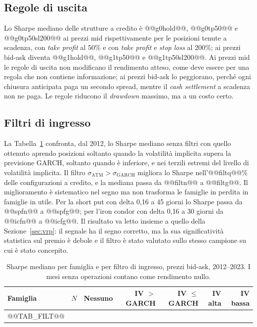 \documentclass[11pt,a4paper]{article}
\begin{document}
\subsection{Regole di uscita}

Lo Sharpe mediano delle strutture a credito è @@g0hold@@, @@g0tp50@@ e @@g0tp50sl200@@ ai prezzi mid rispettivamente per le posizioni tenute a scadenza, con \emph{take profit} al 50\% e con \emph{take profit} e \emph{stop loss} al 200\%; ai prezzi bid-ask diventa @@g1hold@@, @@g1tp50@@ e @@g1tp50sl200@@. Ai prezzi mid le regole di uscita non modificano il rendimento atteso, come deve essere per una regola che non contiene informazione; ai prezzi bid-ask lo peggiorano, perché ogni chiusura anticipata paga un secondo spread, mentre il \emph{cash settlement} a scadenza non ne paga. Le regole riducono il \emph{drawdown} massimo, ma a un costo certo.

\subsection{Filtri di ingresso}

La Tabella~\ref{tab:filt} confronta, dal 2012, lo Sharpe mediano senza filtri con quello ottenuto aprendo posizioni soltanto quando la volatilità implicita supera la previsione GARCH, soltanto quando è inferiore, e nei terzili estremi del livello di volatilità implicita. Il filtro $\sigma_{\mathrm{ATM}}>\sigma_{\mathrm{GARCH}}$ migliora lo Sharpe nell'@@filtq@@\% delle configurazioni a credito, e la mediana passa da @@filtn@@ a @@filtg@@. Il miglioramento è sistematico nel segno ma non trasforma le famiglie in perdita in famiglie in utile. Per la short put con delta 0{,}16 a 45 giorni lo Sharpe passa da @@spfn@@ a @@spfg@@; per l'iron condor con delta 0{,}16 a 30 giorni da @@icfn@@ a @@icfg@@. Il risultato va letto insieme a quello della Sezione~\ref{sec:vrp}: il segnale ha il segno corretto, ma la sua significatività statistica sul premio è debole e il filtro è stato valutato sullo stesso campione su cui è stato concepito.

\begin{table}[ht]\centering\small
\caption{Sharpe mediano per famiglia e per filtro di ingresso, prezzi bid-ask, 2012--2023. I mesi senza operazioni contano come rendimento nullo.}\label{tab:filt}
\begin{tabular}{lrrrrrr}\toprule
Famiglia & $N$ & Nessuno & IV $>$ GARCH & IV $\le$ GARCH & IV alta & IV bassa \\ \midrule
@@TAB_FILT@@
\bottomrule\end{tabular}\end{table}
\end{document}
